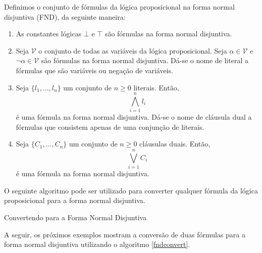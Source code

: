 \begin{Definition}\label{FND}
Definimos o conjunto de fórmulas da lógica proposicional na forma
normal disjuntiva  (FND), da seguinte maneira:
\begin{enumerate}
  \item As constantes lógicas $\bot$ e $\top$ são fórmulas na forma
    normal disjuntiva.
  \item Seja $\mathcal{V}$ o conjunto de todas as variáveis da lógica
    proposicional. Seja $\alpha \in \mathcal{V}$ e
    $\neg\alpha\in\mathcal{V}$ são fórmulas na forma normal
    disjuntiva. Dá-se o nome de literal a fórmulas que são variáveis
    ou negação de variáveis.
  \item Seja $\{l_1,...,l_n\}$ um conjunto de $n\geq 0$
    literais. Então, \[\bigwedge_{i=1}^nl_i\] é uma fórmula na forma
    normal disjuntiva. Dá-se o nome de cláusula dual a fórmulas que
    consistem apenas de uma conjunção de literais.
  \item Seja $\{C_1,...,C_n\}$ um conjunto de $n\geq 0$
    cláusulas duais. Então, \[\bigvee_{i=1}^nC_i\] é uma fórmula na forma
    normal disjuntiva.
\end{enumerate}
\end{Definition}
O seguinte algoritmo pode ser utilizado para converter qualquer
fórmula da lógica proposicional para a forma normal disjuntiva.

\begin{algorithm}
  \begin{algorithmic}[2]
     \EndFor
  \end{algorithmic}
  \caption{Convertendo para a Forma Normal Disjuntiva}
  \label{fndconvert}
\end{algorithm}
A seguir, os próximos exemplos mostram a conversão de duas fórmulas
para a forma normal disjuntiva utilizando o algoritmo
\ref{fndconvert}.

